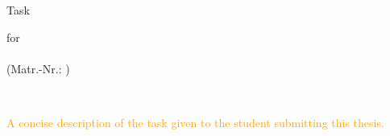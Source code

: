 \pagestyle{title}
\vspace*{2cm}
\begin{center}

    {\Large Task\\}
    {\large for\\
    \Author\\
    (Matr.-Nr.: \matrnr)\par}
    \vspace{.2cm}

    {\Large \EnglishTitle\\}
    \vspace{.2cm}
    {\GermanTitle}
    \vspace{1cm}

\end{center}

\noindent
\textcolor{orange}{A concise description of the task given to the student submitting this thesis.}
\\
\\
\emph{\textcolor{orange}{\blindtext}}